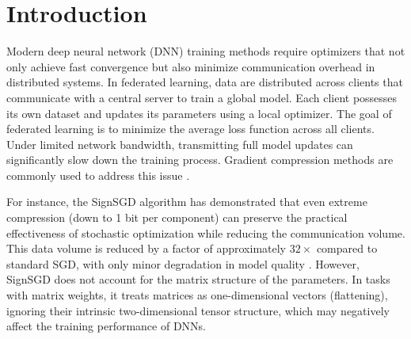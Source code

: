 \documentclass{article}
\begin{document}
\section{Introduction}\label{sec:intro}
Modern deep neural network (DNN) training methods require optimizers that not only achieve fast convergence but also minimize communication overhead in distributed systems. In federated learning, data are distributed across clients that communicate with a central server to train a global model. Each client possesses its own dataset and updates its parameters using a local optimizer. The goal of federated learning is to minimize the average loss function across all clients. Under limited network bandwidth, transmitting full model updates can significantly slow down the training process. Gradient compression methods are commonly used to address this issue \cite{bernstein2018signsgd,  bernstein2019signsgdmajority, beznosikov2020biased}.

For instance, the SignSGD algorithm has demonstrated that even extreme compression (down to 1 bit per component) can preserve the practical effectiveness of stochastic optimization while reducing the communication volume. This data volume is reduced by a factor of approximately $32\times$ compared to standard SGD, with only minor degradation in model quality \cite{bernstein2018signsgd, bernstein2019signsgdmajority}. However, SignSGD does not account for the matrix structure of the parameters. In tasks with matrix weights, it treats matrices as one-dimensional vectors (flattening), ignoring their intrinsic two-dimensional tensor structure, which may negatively affect the training performance of DNNs.
\end{document}
